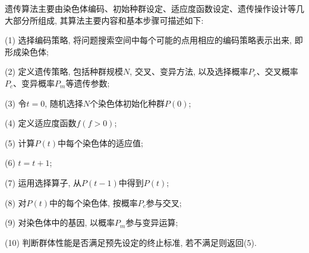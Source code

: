 遗传算法主要由染色体编码、初始种群设定、适应度函数设定、遗传操作设计等几大部分所组成, 其算法主要内容和基本步骤可描述如下:

(1) 选择编码策略, 将问题搜索空间中每个可能的点用相应的编码策略表示出来, 即形成染色体;

(2) 定义遗传策略, 包括种群规模$N$, 交叉、变异方法, 以及选择概率$P_r$、交叉概率$P_c$、变异概率$P_m$等遗传参数;

(3) 令$t=0$, 随机选择$N$个染色体初始化种群$P(0)$;

(4) 定义适应度函数$f(f>0)$;

(5) 计算$P(t)$中每个染色体的适应值;

(6) $t=t+1$;

(7) 运用选择算子, 从$P(t-1)$中得到$P(t)$;

(8) 对$P(t)$中的每个染色体, 按概率$P_c$参与交叉;

(9) 对染色体中的基因, 以概率$P_m$参与变异运算;

(10) 判断群体性能是否满足预先设定的终止标准, 若不满足则返回(5).

